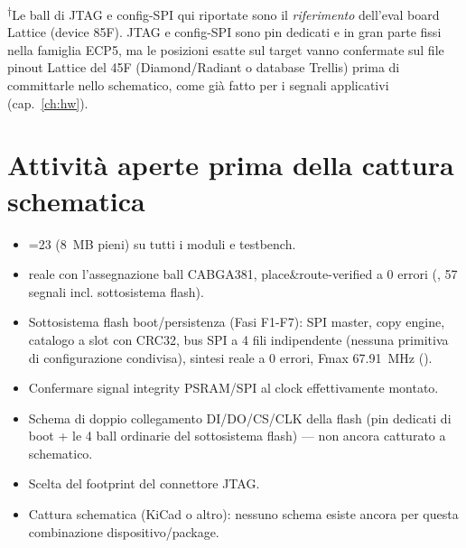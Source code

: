 \begin{fnwarn}
\textsuperscript{$\dagger$}Le ball di JTAG e config-SPI qui riportate sono il
\emph{riferimento} dell'eval board Lattice (device 85F). JTAG e config-SPI sono pin
dedicati e in gran parte fissi nella famiglia ECP5, ma le posizioni esatte sul target
 vanno confermate sul file pinout Lattice del 45F (Diamond/Radiant
o database Trellis) prima di committarle nello schematico, come già fatto per i segnali
applicativi (cap.~\ref{ch:hw}).
\end{fnwarn}

\section{Attività aperte prima della cattura schematica}
\begin{itemize}
\item[\OK] =23 (8~MB pieni) su tutti i moduli e testbench.
\item[\OK]  reale con l'assegnazione ball CABGA381, place\&route-verified a
0 errori (, 57 segnali incl. sottosistema flash).
\item[\OK] Sottosistema flash boot/persistenza (Fasi F1-F7): SPI master, copy engine,
catalogo a slot con CRC32, bus SPI a 4 fili indipendente (nessuna primitiva di
configurazione condivisa), sintesi reale a 0 errori, Fmax 67.91~MHz ().
\item[$\square$] Confermare signal integrity PSRAM/SPI al clock effettivamente montato.
\item[$\square$] Schema di doppio collegamento DI/DO/CS/CLK della flash (pin dedicati di
      boot + le 4 ball ordinarie del sottosistema flash) --- non ancora catturato a
      schematico.
\item[$\square$] Scelta del footprint del connettore JTAG.
\item[$\square$] Cattura schematica (KiCad o altro): nessuno schema esiste ancora per
questa combinazione dispositivo/package.
\end{itemize}
